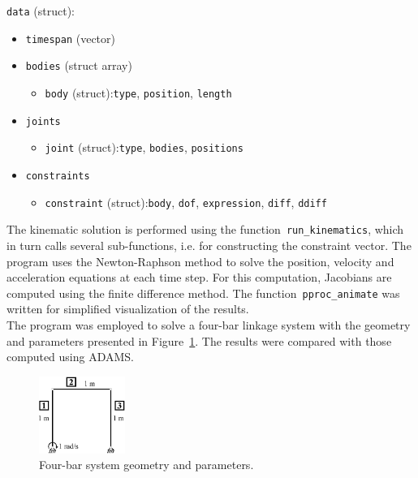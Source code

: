 \documentclass{article}
\begin{document}
	\texttt{data} (struct):
	\vspace{-1ex}
	\begin{itemize}
		\setlength\itemsep{0pt}
		\item \texttt{timespan} (vector)
		\item \texttt{bodies} (struct array)
		\vspace{-1ex}
		\begin{itemize}
			\setlength\itemsep{0pt}
			\item \texttt{body} (struct):\quad \texttt{type}, \texttt{position}, \texttt{length}
		\end{itemize}
		\item \texttt{joints}
		\vspace{-1ex}
		\begin{itemize}
			\setlength\itemsep{0pt}
			\item \texttt{joint} (struct):\quad \texttt{type}, \texttt{bodies}, \texttt{positions}
		\end{itemize}
		\item \texttt{constraints}
		\vspace{-1ex}
		\begin{itemize}
			\setlength\itemsep{0pt}
			\item \texttt{constraint} (struct):\quad \texttt{body}, \texttt{dof}, \texttt{expression}, \texttt{diff}, \texttt{ddiff}
		\end{itemize}
	\end{itemize}
	
	The kinematic solution is performed using the function~\texttt{run\_kinematics}, which in turn calls several sub-functions, i.e. for constructing the constraint vector. The program uses the Newton-Raphson method to solve the position, velocity and acceleration equations at each time step. For this computation, Jacobians are computed using the finite difference method. The function~\texttt{pproc\_animate} was written for simplified visualization of the results.\\
	
	The program was employed to solve a four-bar linkage system with the geometry and parameters presented in Figure~\ref*{fig:system}. The results were compared with those computed using ADAMS.
	
	\begin{figure}[htb]
		\centering
		\includegraphics[width=0.25\textwidth]{system.eps}
		\caption{Four-bar system geometry and parameters.\label{fig:system}}
	\end{figure}
\end{document}
